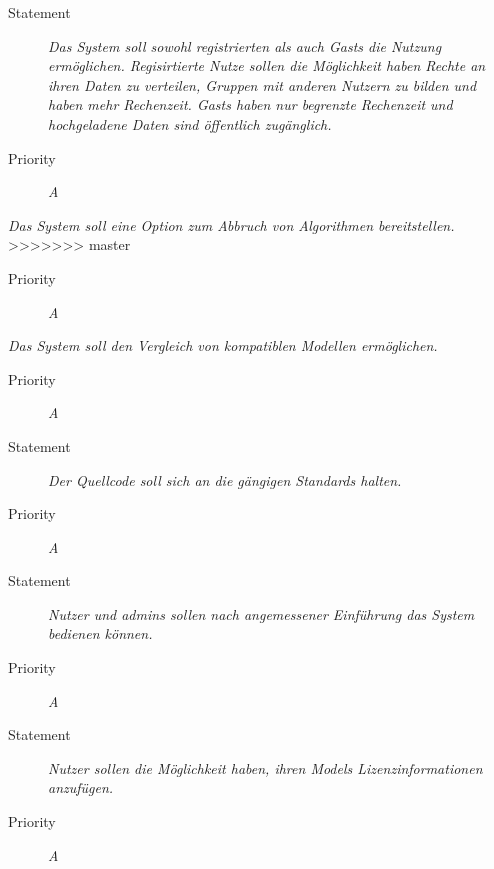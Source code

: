 
\UR
\begin{description}
\item[Statement] \textit{Das System soll sowohl registrierten als auch \glspl{Gast} die Nutzung ermöglichen. Regisirtierte Nutze sollen die Möglichkeit haben Rechte an ihren Daten zu verteilen, Gruppen mit anderen Nutzern zu bilden und haben mehr Rechenzeit. \glspl{Gast} haben nur begrenzte Rechenzeit und hochgeladene Daten sind öffentlich zugänglich.}
\item[Priority] \textit{A}
\end{description}


\UR
\item[Statement] \textit{Das System soll eine Option zum Abbruch von Algorithmen bereitstellen.}
>>>>>>> master
\begin{description}
\item[Priority] \textit{A}
\end{description}


\UR
\item[Statement] \textit{Das System soll den Vergleich von kompatiblen Modellen ermöglichen.}
\begin{description}
\item[Priority] \textit{A}
\end{description}


\UR
\begin{description}
\item[Statement] \textit{Der Quellcode soll sich an die gängigen Standards halten.}
\item[Priority] \textit{A}
\end{description}

\UR
\begin{description}
\item[Statement] \textit{Nutzer und \glspl{admin} sollen nach angemessener Einführung das System bedienen können.}
\item[Priority] \textit{A}
\end{description}


\UR
\begin{description}
\item[Statement] \textit{Nutzer sollen die Möglichkeit haben, ihren \glspl{Model} Lizenzinformationen anzufügen.}
  \item[Priority]
    \textit{A}
\end{description}


